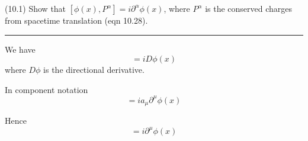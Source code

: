 \documentclass[12pt]{article}
\begin{document}
(10.1)
Show that $[\phi(x),P^\alpha]=i\partial^\alpha\phi(x)$, where $P^\alpha$ is
the conserved charges from spacetime translation
(eqn 10.28).

\bigskip
\hrule

\bigskip
We have
\begin{equation*}
[\phi(x),P]=iD\phi(x)
\end{equation*}
where $D\phi$ is the directional derivative.

\bigskip
In component notation
\begin{equation*}
[\phi(x),a_\mu P^\mu]=ia_\mu\partial^\mu\phi(x)
\end{equation*}

Hence
\begin{equation*}
[\phi(x),P^\mu]=i\partial^\mu\phi(x)
\end{equation*}
\end{document}
